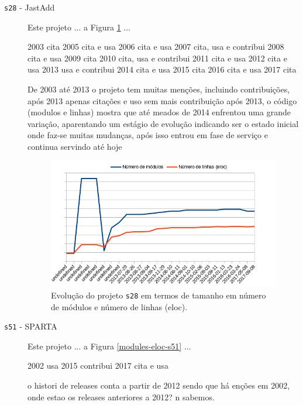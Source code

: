 \begin{description}
  \item[\texttt{s28} - JastAdd]
    Este projeto ... a Figura \ref{modules-eloc-s28} ...

2003	cita
2005	cita e usa
2006	cita e usa
2007	cita, usa e contribui
2008	cita e usa
2009	cita
2010	cita, usa e contribui
2011	cita e usa
2012	cita e usa
2013	usa e contribui
2014	cita e usa
2015	cita
2016	cita e usa
2017	cita

De 2003 até 2013 o projeto tem muitas menções, incluindo contribuições, após 2013 apenas citações e uso
sem mais contribuição após 2013, o código (modulos e linhas) mostra que até meados de 2014 enfrentou
uma grande variação, aparentando um estágio de evolução indicando ser o estado inicial onde faz-se muitas
mudanças, após isso entrou em fase de serviço e continua servindo até hoje

\begin{figure}[h]
  \centering
  \includegraphics[scale=0.6]{imagens/modules-eloc-s28.png}
  \caption{Evolução do projeto \texttt{s28} em termos de tamanho em número de módulos e número de linhas (eloc).}
  \label{modules-eloc-s28}
\end{figure}

  \item[\texttt{s51} - SPARTA]
    Este projeto ... a Figura \ref{modules-eloc-s51} ...

2002	usa
2015	contribui
2017	cita e usa

o histori de releases conta a partir de 2012 sendo
que há enções em 2002, onde estao os releases
anteriores a 2012? n sabemos.


\end{description}
